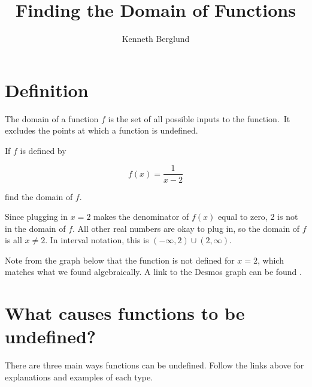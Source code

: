 \documentclass{ximera}
\title{Finding the Domain of Functions}
\author{Kenneth Berglund}
\begin{document}
\begin{abstract}
\end{abstract}
\maketitle

\section{Definition}

The domain of a function $f$ is the set of all possible inputs to the function. It excludes the points at which a function is undefined. 

\begin{example}
If $f$ is defined by 

$$f(x) = \frac{1}{x - 2}$$

find the domain of $f$. 

\begin{explanation}
Since plugging in $x = 2$ makes the denominator of $f(x)$ equal to zero, 2 is not in the domain of $f$. All other real numbers are okay to plug in, so the domain of $f$ is all $x \ne 2$. In interval notation, this is $(-\infty, 2) \cup (2, \infty)$.

Note from the graph below that the function is not defined for $x = 2$, which matches what we found algebraically. A link to the Desmos graph can be found . 

\begin{center}
\end{center}
\end{explanation}
\end{example}

\section{What causes functions to be undefined?}
There are three main ways functions can be undefined. Follow the links above for explanations and examples of each type.
\end{document}
